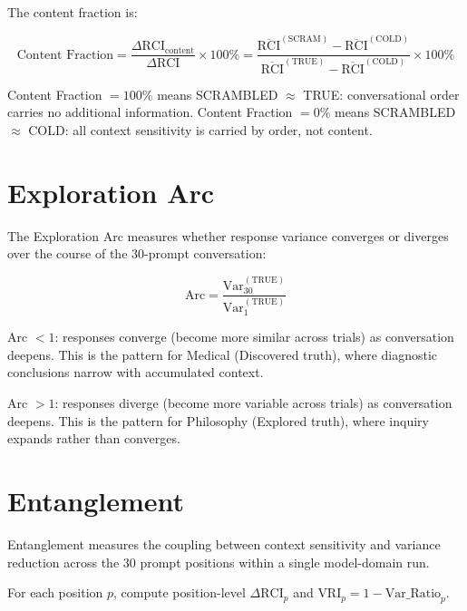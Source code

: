 \documentclass[11pt,a4paper]{article}
\begin{document}
The content fraction is:

\begin{equation}
    \text{Content Fraction} = \frac{\Delta\text{RCI}_{\text{content}}}
    {\Delta\text{RCI}} \times 100\%
    = \frac{\overline{\text{RCI}}^{(\text{SCRAM})} - \overline{\text{RCI}}^{(\text{COLD})}}
    {\overline{\text{RCI}}^{(\text{TRUE})} - \overline{\text{RCI}}^{(\text{COLD})}}
    \times 100\%
\end{equation}

Content Fraction $= 100\%$ means SCRAMBLED $\approx$ TRUE: conversational order
carries no additional information. Content Fraction $= 0\%$ means SCRAMBLED $\approx$
COLD: all context sensitivity is carried by order, not content.

\section{Exploration Arc}
\label{sec:arc}

The Exploration Arc measures whether response variance converges or diverges over the
course of the 30-prompt conversation:

\begin{equation}
    \text{Arc} = \frac{\text{Var}_{30}^{(\text{TRUE})}}{\text{Var}_{1}^{(\text{TRUE})}}
\end{equation}

Arc $< 1$: responses converge (become more similar across trials) as conversation
deepens. This is the pattern for Medical (Discovered truth), where diagnostic
conclusions narrow with accumulated context.

Arc $> 1$: responses diverge (become more variable across trials) as conversation
deepens. This is the pattern for Philosophy (Explored truth), where inquiry expands
rather than converges.

\section{Entanglement}
\label{sec:entanglement}

Entanglement measures the coupling between context sensitivity and variance reduction
across the 30 prompt positions within a single model-domain run.

For each position $p$, compute position-level $\Delta\text{RCI}_p$ and
$\text{VRI}_p = 1 - \text{Var\_Ratio}_p$.
\end{document}
